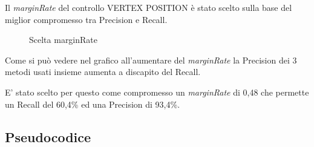 \documentclass[
  italian,
]{article}
\begin{document}
Il \emph{marginRate} del controllo VERTEX POSITION è stato scelto sulla base del miglior compromesso tra Precision e Recall.

\begin{figure}
\centering
{}%
\qquad
{}%
\caption{Scelta marginRate}
\end{figure}

Come si può vedere nel grafico all'aumentare del \emph{marginRate} la Precision dei 3 metodi usati insieme 
aumenta a discapito del Recall.

E' stato scelto per questo come compromesso un \emph{marginRate} di 0,48 che permette un Recall del 60,4\% ed una Precision di 93,4\%.

\pagebreak 

\hypertarget{pseudocodice}{%
\subsection{Pseudocodice}\label{pseudocodice}}
\end{document}
